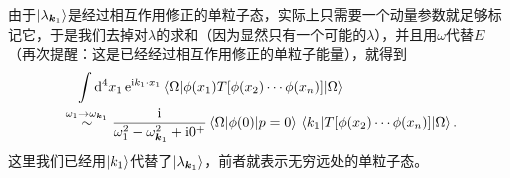 \documentclass[hyperref, UTF8, a4paper]{ctexart}
\newcommand*{\ii}{\mathrm{i}}
\newcommand*{\ee}{\mathrm{e}}
\begin{document}
由于$\ket{\lambda_{\vb*{k}_1}}$是经过相互作用修正的单粒子态，实际上只需要一个动量参数就足够标记它，于是我们去掉对$\lambda$的求和（因为显然只有一个可能的$\lambda$），并且用$\omega$代替$E$（再次提醒：这是已经经过相互作用修正的单粒子能量），就得到
\begin{equation}
    \begin{aligned}
        &\quad \int \dd[4]{x_1} \ee^{\ii k_1 \cdot x_1} \mel{\Omega}{\phi(x_1) T [\phi(x_2) \cdots \phi(x_n)]}{\Omega} \\
        &\stackrel{\omega_1 \to \omega_{\vb*{k}_1}}{\sim} \frac{\ii}{\omega_1^2 - \omega_{\vb*{k}_1}^2 + \ii 0^+} \mel*{\Omega}{\phi(0)}{p={0}} \mel*{k_1}{T [\phi(x_2) \cdots \phi(x_n)]}{\Omega}.
    \end{aligned}
    \label{eq:scalar-correlation-pole-single}
\end{equation}
这里我们已经用$\ket{k_1}$代替了$\ket{\lambda_{\vb*{k}_1}}$，前者就表示无穷远处的单粒子态。
\end{document}
